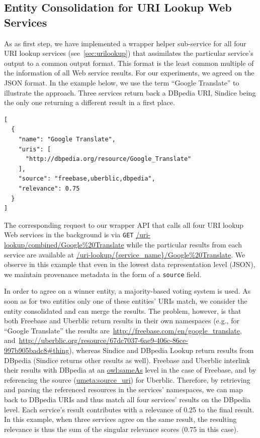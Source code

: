 \documentclass[twocolumn]{article}
\newcommand{\nofootnote}[1]{~#1}
\begin{document}
\subsection{Entity Consolidation for URI Lookup Web Services}               \label{sec:consolidation-uri}
As as first step, we have implemented a wrapper helper sub-service for all four URI lookup services (see~\ref{sec:urilookup}) that assimilates the particular
service's output to a common output format. This format is the least common multiple of the information of all Web
service results. For our experiments, we agreed on the JSON format. In the example below, we use the term ``Google
Translate'' to illustrate the approach. Three services return back a DBpedia URI, Sindice being the only one returning
a different result in a first place.
\begin{lstlisting}
[
  {
    "name": "Google Translate",
    "uris": [
      "http://dbpedia.org/resource/Google_Translate"
    ],
    "source": "freebase,uberblic,dbpedia",
    "relevance": 0.75
  }
]
\end{lstlisting}

The corresponding request to our wrapper API that calls all four URI lookup Web services in the background is via
\texttt{GET}
\url{/uri-lookup/combined/Google%20Translate} while the particular results from each service are available at
\url{/uri-lookup/{service_name}/Google%20Translate}.
We observe in this example that even in the lowest data representation level (JSON), we maintain provenance metadata in
the form of a \texttt{source} field.

In order to agree on a winner entity, a majority-based voting system is used. As soon as for two entities only one of
these entities' URIs match, we consider the entity consolidated and can merge the results. The problem, however, is
that both Freebase and Uberblic return results in their own namespaces (e.g., for ``Google Translate'' the results
are\nofootnote{\url{http://freebase.com/en/google_translate}},
and\nofootnote{\url{http://uberblic.org/resource/67dc7037-6ae9-406c-86ce-997b905badc8#thing}}), whereas Sindice and
DBpedia Lookup return results from DBpedia (Sindice returns other results as well). Freebase and Uberblic interlink
their results with DBpedia at an \url{owl:sameAs} level in the case of Freebase, and by referencing the source
(\url{umeta:source_uri}) for Uberblic. Therefore, by retrieving and parsing the referenced resources in the services'
namespaces, we can map back to DBpedia URIs and thus match all four services' results on the DBpedia level. Each
service's result contributes with a relevance of 0.25 to the final result. In this example, when three services agree
on the same result, the resulting relevance is thus the sum of the singular relevance scores (0.75 in this case).
\end{document}
